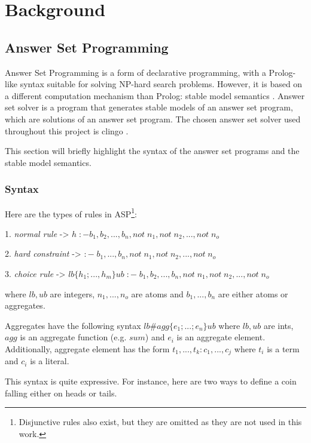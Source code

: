 \chapter{Background}


\section{Answer Set Programming}

Answer Set Programming  \cite{RefWorks:RefID:1-lifschitz2008answer} is a form of declarative programming, with a Prolog-like syntax suitable for solving NP-hard search problems.
However, it is based on a different computation mechanism than Prolog: stable model semantics \cite{RefWorks:RefID:21-fitting1992michael}.
Answer set solver is a program that generates stable models of an answer set program, which are solutions of an answer set program. 
The chosen answer set solver used throughout this project is clingo \cite{RefWorks:RefID:22-clingo}.

This section will briefly highlight the syntax of the answer set programs and the stable model semantics.

\subsection{Syntax}

Here are the types of rules in ASP\footnote{Disjunctive rules also exist, but they are omitted as they are not used in this work.}: 

 1. \emph{normal rule} -> $ h\; :- b_1, b_2, ..., b_n, not\; n_1, not\; n_2, ..., not\; n_o$
 
 2. \emph{hard constraint} -> $:- \; b_1, ..., b_n, not\; n_1, not\; n_2, ..., not\; n_o$
 
 3. \emph{choice rule} -> $lb\{h_1; ..., h_m\}ub\; :- \;  b_1, b_2, ..., b_n, not\; n_1, not\; n_2, ..., not\; n_o$
 
where $lb, ub$ are integers, $n_1,...,n_o$ are atoms and $b_1, ...,b_n$ are either atoms or aggregates.

Aggregates have the following syntax $lb\#agg\{e_1; ...; e_n\}ub$ where $lb, ub$ are ints, $agg$ is an aggregate function (e.g. $sum$) and $e_i$ is an aggregate element.
Additionally, aggregate element has the form  $t_1, ..., t_k : c_1, ..., c_j$ where $t_i$ is a term and $c_i$ is a literal.
 
This syntax is quite expressive. For instance, here are two ways to define a coin falling either on heads or tails.


